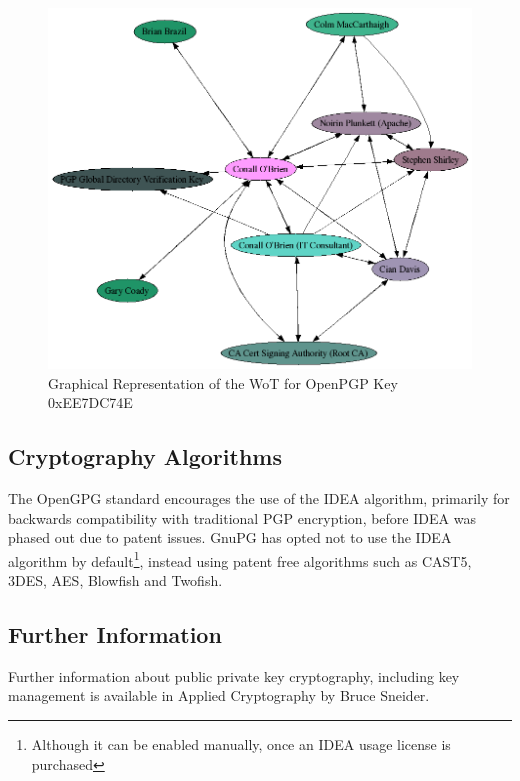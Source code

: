 \begin{figure}[ht]

\label{fig:wot}

\begin{center}

\includegraphics[bb= 0 0 868 739,scale=0.5]{include/EE7DC74E.png}

\end{center}

\caption{Graphical Representation of the WoT for OpenPGP Key 0xEE7DC74E}

\end{figure}

\clearpage

\subsection{Cryptography Algorithms}

The OpenGPG standard encourages the use of the IDEA algorithm, primarily
for backwards compatibility with traditional PGP encryption, before IDEA
was phased out due to patent issues. GnuPG has opted not to use the IDEA
algorithm by default\footnote{Although it can be enabled manually, once an IDEA usage license is purchased},
instead using patent free algorithms such as CAST5, 3DES, AES, Blowfish
and Twofish.

\subsection{Further Information}

Further information about public private key cryptography, including key
management is available in Applied Cryptography by Bruce Sneider.
